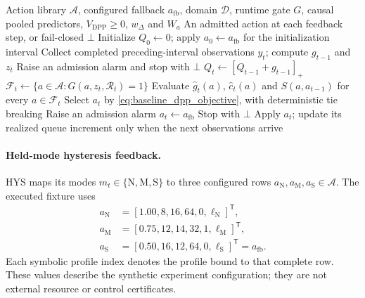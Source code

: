 \begin{algorithm}[t]
\caption{Runtime-Admitted Drift-Plus-Penalty Feedback}
\label{alg:dpp}
\small
\begin{algorithmic}[1]
\Require Action library $\mathcal{A}$, configured fallback $a_{\mathrm{fb}}$,
 domain $\mathcal{D}$, runtime gate $G$, causal pooled predictors,
 $V_{\mathrm{DPP}}\geq0$, $w_{\Delta}$ and $W_a$
\Ensure An admitted action at each feedback step, or fail-closed $\bot$
\State Initialize $Q_0\gets0$; apply $a_0\gets a_{\mathrm{fb}}$ for the initialization interval
 \State Collect completed preceding-interval observations $y_t$;
 compute $g_{t-1}$ and $z_t$
  \State Raise an admission alarm and stop with $\bot$
 \EndIf
 \State $Q_t\gets[Q_{t-1}+g_{t-1}]_+$
 \State $\mathcal{F}_t\gets\{a\in\mathcal{A}:G(a,z_t,\mathcal{R}_t)=1\}$
  \State Evaluate $\widehat{g}_t(a)$, $\widehat{c}_t(a)$ and
  $S(a,a_{t-1})$ for every $a\in\mathcal{F}_t$
  \State Select $a_t$ by \eqref{eq:baseline_dpp_objective}, with deterministic tie breaking
 \Else
  \State Raise an admission alarm
   \State $a_t\gets a_{\mathrm{fb}}$
  \Else
   \State Stop with $\bot$
  \EndIf
 \EndIf
 \State Apply $a_t$; update its realized queue increment only when the next observations arrive
\EndFor
\end{algorithmic}
\end{algorithm}

\paragraph{Held-mode hysteresis feedback.}
HYS maps its modes $m_t\in\{\mathrm{N},\mathrm{M},\mathrm{S}\}$ to three
configured rows $a_{\mathrm{N}},a_{\mathrm{M}},a_{\mathrm{S}}\in\mathcal{A}$.
The executed fixture uses
\begin{equation}
 \begin{aligned}
 a_{\mathrm{N}}&=[1.00,8,16,64,0,\ell_{\mathrm{N}}]^{\mathsf T},\\
 a_{\mathrm{M}}&=[0.75,12,14,32,1,\ell_{\mathrm{M}}]^{\mathsf T},\\
 a_{\mathrm{S}}&=[0.50,16,12,64,0,\ell_{\mathrm{S}}]^{\mathsf T}
                =a_{\mathrm{fb}}.
 \end{aligned}
 \label{eq:baseline_hys_actions}
\end{equation}
Each symbolic profile index denotes the profile bound to that complete row.
These values describe the synthetic experiment configuration; they are not
external resource or control certificates.

